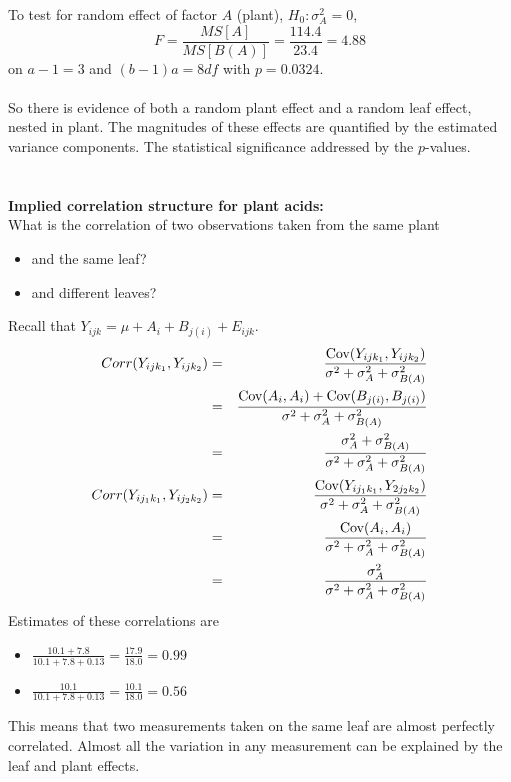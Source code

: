 To test for random effect of factor $A$ (plant), $H_0: \sigma_A^2=0$, 
$$ F=\frac{MS[A]}{MS[B(A)]} = \frac{114.4}{23.4} = 4.88$$
on $a-1=3$ and $(b-1)a=8 df$ with $p=0.0324$.   \\~\\

So there is evidence of both a random plant effect and a random leaf effect, nested in plant.  The magnitudes of these effects are quantified by the estimated variance components.  The statistical significance addressed by the $p$-values.  \\~\\~\\

\textbf{Implied correlation structure for plant acids:}\\
What is the correlation of two observations taken from the same plant
\begin{itemize}
\item and the same leaf?
\item and different leaves?
\end{itemize}
Recall that $Y_{ijk}=\mu + A_i + B_{j(i)} + E_{ijk}$.
\begin{eqnarray*}
Corr(Y_{ij k_1},Y_{ij k_2}) & = & \frac{\mbox{Cov}(Y_{ij k_1},Y_{ij k_2})} 
{\sigma^2 + \sigma_{A}^2 + \sigma_{B(A)}^2}\\
& = & \frac{\mbox{Cov}(A_i,A_i) + \mbox{Cov}(B_{j(i)}, B_{j(i)})}
{\sigma^2 + \sigma_{A}^2 + \sigma_{B(A)}^2}\\
& = & \frac{\sigma_A^2 + \sigma_{B(A)}^2}
{\sigma^2 + \sigma_{A}^2 + \sigma_{B(A)}^2}\\
Corr(Y_{i j_1 k_1},Y_{i j_2 k_2}) & = & \frac{\mbox{Cov}(Y_{i j_1 k_1},Y_{2 j_2 k_2})} 
{\sigma^2 + \sigma_{A}^2 + \sigma_{B(A)}^2}\\
& = & \frac{\mbox{Cov}(A_i,A_i)} 
{\sigma^2 + \sigma_{A}^2 + \sigma_{B(A)}^2}\\
& = & \frac{\sigma_A^2} 
{\sigma^2 + \sigma_{A}^2 + \sigma_{B(A)}^2}\\
\end{eqnarray*}
Estimates of these correlations are 
\begin{itemize}
\item $\frac{10.1+7.8}{10.1+7.8+0.13} = \frac{17.9}{18.0} = 0.99$
\item $\frac{10.1}{10.1+7.8+0.13} = \frac{10.1}{18.0} = 0.56$
\end{itemize}
This means that two measurements taken on the same leaf are almost perfectly correlated.  Almost all the variation in any measurement can be
explained by the leaf and plant effects.

